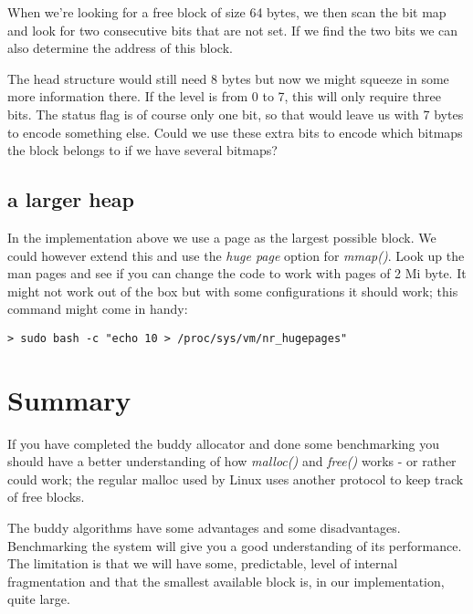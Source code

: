 \documentclass[a4paper,11pt]{article}
\begin{document}
When we're looking for a free block of size 64 bytes, we then scan the
bit map and look for two consecutive bits that are not set. If we find
the two bits we can also determine the address of this block.

The head structure would still need 8 bytes but now we might squeeze in
some more information there. If the level is from 0 to 7, this will only require
three bits. The status flag is of course only one bit, so that would
leave us with 7 bytes to encode something else. Could we use these extra bits to
encode which bitmaps the block belongs to if we have several bitmaps?

\subsection{a larger heap}

In the implementation above we use a page as the largest possible
block. We could however extend this and use the {\em huge page} option
for {\em mmap()}. Look up the man pages and see if you can change the
code to work with pages of 2 Mi byte. It might not work out of the box
but with some configurations it should work; this command might come in handy:

\begin{verbatim}
> sudo bash -c "echo 10 > /proc/sys/vm/nr_hugepages"
\end{verbatim}


\section{Summary}

If you have completed the buddy allocator and done some benchmarking
you should have a better understanding of how {\em malloc()} and {\em
  free()} works - or rather could work; the regular malloc used by
Linux uses another protocol to keep track of free blocks.

The buddy algorithms have some advantages and some
disadvantages. Benchmarking the system will give you a good
understanding of its performance. The limitation is that we will have
some, predictable, level of internal fragmentation and that the
smallest available block is, in our implementation, quite large.
\end{document}
